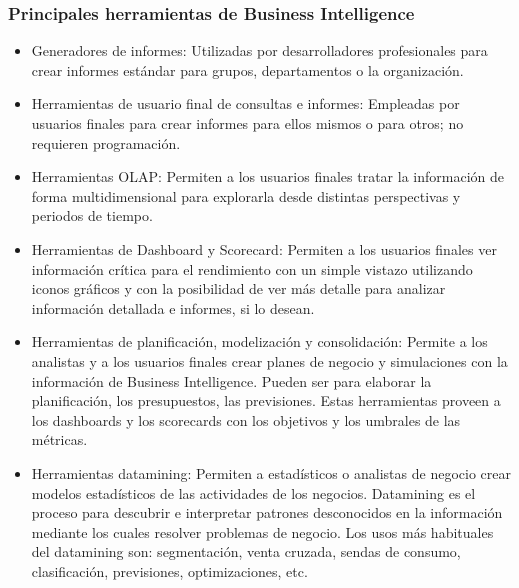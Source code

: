 \documentclass[twoside,twocolumn]{article}
\begin{document}
\subsubsection{Principales herramientas de Business Intelligence}
\begin{itemize}
    \item  Generadores de informes: Utilizadas por desarrolladores profesionales para crear informes estándar para grupos, departamentos o la organización. 
    \item   Herramientas de usuario final de consultas e informes: Empleadas por usuarios finales para crear informes para ellos mismos o para otros; no requieren programación. 
    \item   Herramientas OLAP: Permiten a los usuarios finales tratar la información de forma multidimensional para explorarla desde distintas perspectivas y periodos de tiempo. 
    \item   Herramientas de Dashboard y Scorecard: Permiten a los usuarios finales ver información crítica para el rendimiento con un simple vistazo utilizando iconos gráficos y con la posibilidad de ver más detalle para analizar información detallada e informes, si lo desean.
    \item   Herramientas de planificación, modelización y consolidación: Permite a los analistas y a los usuarios finales crear planes de negocio y simulaciones con la información de Business Intelligence. Pueden ser para elaborar la planificación, los presupuestos, las previsiones. Estas herramientas proveen a los dashboards y los scorecards con los objetivos y los umbrales de las métricas.  
    \item   Herramientas datamining: Permiten a estadísticos o analistas de negocio crear modelos estadísticos de las actividades de los negocios. Datamining es el proceso para descubrir e interpretar patrones desconocidos en la información mediante los cuales resolver problemas de negocio. Los usos más habituales del datamining son: segmentación, venta cruzada, sendas de consumo, clasificación, previsiones, optimizaciones, etc.
\end{itemize}
\end{document}

